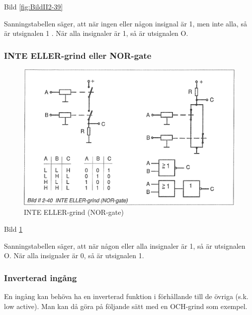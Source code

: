 Bild \ref{fig:BildII2-39}

Sanningstabellen säger, att när ingen eller någon insignal är 1, men inte alla,
så är utsignalen 1 . När alla insignaler är 1, så är utsignalen O.

\subsubsection{INTE ELLER-grind eller NOR-gate}

\begin{figure}[h]
\begin{center}
\includegraphics[width=14cm]{images/bild_2_2-40}
\caption{INTE ELLER-grind (NOR-gate)}
\label{fig:BildII2-40}
\end{center}
\end{figure}

Bild \ref{fig:BildII2-40}

Sanningstabellen säger, att när någon eller alla insignaler är 1, så är
utsignalen O. När alla insignaler är 0, så är utsignalen 1.

\subsubsection{Inverterad ingång}

En ingång kan behöva ha en inverterad funktion i förhållande till de övriga
(s.k. low active). Man kan då göra på följande sätt med en OCH-grind som
exempel.


